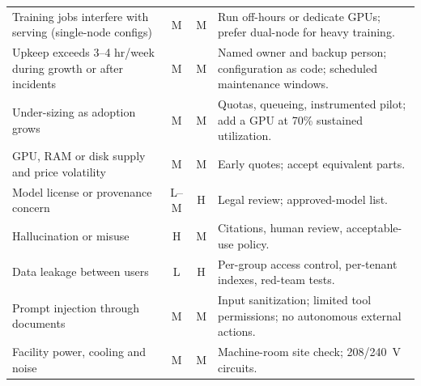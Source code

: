 {\begin{xltabular}{\textwidth}{@{}Y{0.839} c c Y{1.161}@{}}
  Training jobs interfere with serving (single-node configs) & M & M & Run off-hours or dedicate GPUs; prefer dual-node for heavy training. \\
  Upkeep exceeds 3--4 hr/week during growth or after incidents & M & M & Named owner and backup person; configuration as code; scheduled maintenance windows. \\
  Under-sizing as adoption grows & M & M & Quotas, queueing, instrumented pilot; add a GPU at 70\% sustained utilization. \\
  GPU, RAM or disk supply and price volatility & M & M & Early quotes; accept equivalent parts. \\
  Model license or provenance concern & L--M & H & Legal review; approved-model list. \\
  Hallucination or misuse & H & M & Citations, human review, acceptable-use policy. \\
  Data leakage between users & L & H & Per-group access control, per-tenant indexes, red-team tests. \\
  Prompt injection through documents & M & M & Input sanitization; limited tool permissions; no autonomous external actions. \\
  Facility power, cooling and noise & M & M & Machine-room site check; 208/240~V circuits. \\
  \bottomrule
\end{xltabular}}
